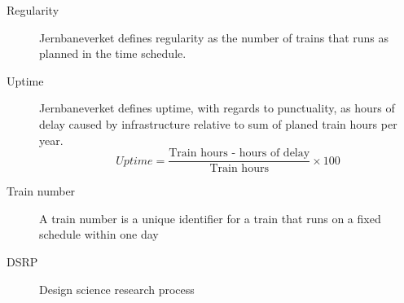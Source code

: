 \label{sec:abbriv}
\vspace{5mm}

\begin{description}
\item [Regularity]	Jernbaneverket defines regularity as the number of trains that runs as planned in the time schedule. 
\item [Uptime]	Jernbaneverket defines uptime, with regards to punctuality, as hours of delay caused by infrastructure relative to sum of planed train hours per year. \begin{equation} Uptime =
\frac{\text{Train hours - hours of delay}}{\text{Train hours}}\times 100 \end{equation}
\item [Train number] A train number is a unique identifier for a train that 
runs on a fixed schedule within one day
\item [DSRP] Design science research process
\end{description}



